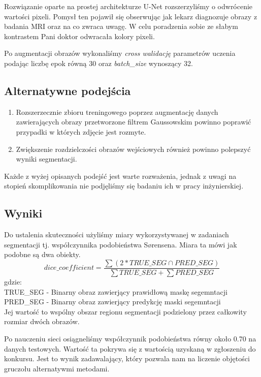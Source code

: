 \documentclass[a4paper,11pt,twoside]{report}
\theoremstyle{definition}
\begin{document}
Rozwiązanie oparte na prostej architekturze U-Net rozszerzyliśmy o odwrócenie wartości pixeli. Pomysł ten pojawił się obserwując jak lekarz diagnozuje obrazy z badania MRI oraz na co zwraca uwagę. W celu poradzenia sobie ze słabym kontrastem Pani doktor odwracała kolory pixeli.

Po augmentacji obrazów wykonaliśmy \textit{cross walidację} parametrów uczenia podając liczbę epok równą 30 oraz \textit{batch\_size} wynoszący 32.

\subsection{Alternatywne podejścia}
\begin{enumerate}
\item Rozszerzecznie zbioru treningowego poprzez augmentację danych zawierających obrazy przetworzone filtrem Gaussowskim powinno poprawić przypadki w których zdjęcie jest rozmyte.
\item Zwiększenie rozdzielczości obrazów wejściowych również powinno polepszyć wyniki segmentacji.
\end{enumerate}
Każde z wyżej opisanych podejść jest warte rozważenia, jednak z uwagi na stopień skomplikowania nie podjęliśmy się badaniu ich w pracy inżynierskiej.


\subsection{Wyniki}

Do ustalenia skuteczności użyliśmy miary wykorzystywanej w zadaniach segmentacji tj. współczynnika podobieństwa Sørensena. Miara ta mówi jak podobne są dwa obiekty. 
\[dice\_coefficient =  \dfrac { \sum (2 * TRUE\_SEG \cap PRED\_SEG) }  { \sum TRUE\_SEG +  \sum PRED\_SEG} \]
gdzie: \\
TRUE\_SEG - Binarny obraz zawierjący prawidłową maskę segemntacji \\
PRED\_SEG - Binarny obraz zawierjący predykcję maski segemntacji \\
Jej wartość to wspólny obszar regionu segmentacji podzielony przez całkowity rozmiar dwóch obrazów.


Po nauczeniu sieci osiągneliśmy współczynnik podobieństwa równy około 0.70 na danych testowych. Wartość ta pokrywa się z wartością uzyskaną w zgłoszeniu do konkursu. Jest to wynik zadawalający, który pozwala nam na liczenie objętości gruczołu alternatywmi metodami.

\par
\end{document}
